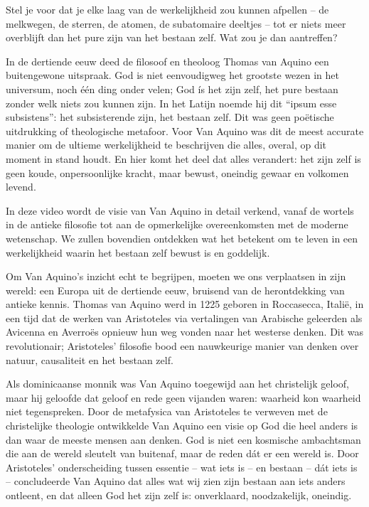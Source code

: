 Stel je voor dat je elke laag van de werkelijkheid zou kunnen afpellen – de melkwegen, de sterren, de atomen, de subatomaire deeltjes – tot er niets meer overblijft dan het pure zijn van het bestaan zelf. Wat zou je dan aantreffen?

In de dertiende eeuw deed de filosoof en theoloog Thomas van Aquino een buitengewone uitspraak. God is niet eenvoudigweg het grootste wezen in het universum, noch één ding onder velen; God ís het zijn zelf, het pure bestaan zonder welk niets zou kunnen zijn. In het Latijn noemde hij dit “ipsum esse subsistens”: het subsisterende zijn, het bestaan zelf. Dit was geen poëtische uitdrukking of theologische metafoor. Voor Van Aquino was dit de meest accurate manier om de ultieme werkelijkheid te beschrijven die alles, overal, op dit moment in stand houdt. En hier komt het deel dat alles verandert: het zijn zelf is geen koude, onpersoonlijke kracht, maar bewust, oneindig gewaar en volkomen levend.

In deze video wordt de visie van Van Aquino in detail verkend, vanaf de wortels in de antieke filosofie tot aan de opmerkelijke overeenkomsten met de moderne wetenschap. We zullen bovendien ontdekken wat het betekent om te leven in een werkelijkheid waarin het bestaan zelf bewust is en goddelijk.

Om Van Aquino's inzicht echt te begrijpen, moeten we ons verplaatsen in zijn wereld: een Europa uit de dertiende eeuw, bruisend van de herontdekking van antieke kennis. Thomas van Aquino werd in 1225 geboren in Roccasecca, Italië, in een tijd dat de werken van Aristoteles via vertalingen van Arabische geleerden als Avicenna en Averroës opnieuw hun weg vonden naar het westerse denken. Dit was revolutionair; Aristoteles’ filosofie bood een nauwkeurige manier van denken over natuur, causaliteit en het bestaan zelf.

Als dominicaanse monnik was Van Aquino toegewijd aan het christelijk geloof, maar hij geloofde dat geloof en rede geen vijanden waren: waarheid kon waarheid niet tegenspreken. Door de metafysica van Aristoteles te verweven met de christelijke theologie ontwikkelde Van Aquino een visie op God die heel anders is dan waar de meeste mensen aan denken. God is niet een kosmische ambachtsman die aan de wereld sleutelt van buitenaf, maar de reden dát er een wereld is. Door Aristoteles’ onderscheiding tussen essentie – wat iets is – en bestaan – dát iets is – concludeerde Van Aquino dat alles wat wij zien zijn bestaan aan iets anders ontleent, en dat alleen God het zijn zelf is: onverklaard, noodzakelijk, oneindig.

